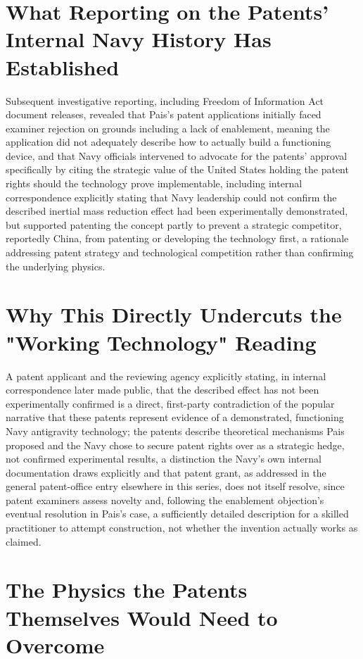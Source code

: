 \documentclass[11pt]{article}
\begin{document}
\section{What Reporting on the Patents' Internal Navy History Has Established}

Subsequent investigative reporting, including Freedom of Information Act document releases, revealed that Pais's patent applications initially faced examiner rejection on grounds including a lack of enablement, meaning the application did not adequately describe how to actually build a functioning device, and that Navy officials intervened to advocate for the patents' approval specifically by citing the strategic value of the United States holding the patent rights should the technology prove implementable, including internal correspondence explicitly stating that Navy leadership could not confirm the described inertial mass reduction effect had been experimentally demonstrated, but supported patenting the concept partly to prevent a strategic competitor, reportedly China, from patenting or developing the technology first, a rationale addressing patent strategy and technological competition rather than confirming the underlying physics.

\section{Why This Directly Undercuts the "Working Technology" Reading}

A patent applicant and the reviewing agency explicitly stating, in internal correspondence later made public, that the described effect has not been experimentally confirmed is a direct, first-party contradiction of the popular narrative that these patents represent evidence of a demonstrated, functioning Navy antigravity technology; the patents describe theoretical mechanisms Pais proposed and the Navy chose to secure patent rights over as a strategic hedge, not confirmed experimental results, a distinction the Navy's own internal documentation draws explicitly and that patent grant, as addressed in the general patent-office entry elsewhere in this series, does not itself resolve, since patent examiners assess novelty and, following the enablement objection's eventual resolution in Pais's case, a sufficiently detailed description for a skilled practitioner to attempt construction, not whether the invention actually works as claimed.

\section{The Physics the Patents Themselves Would Need to Overcome}
\end{document}
